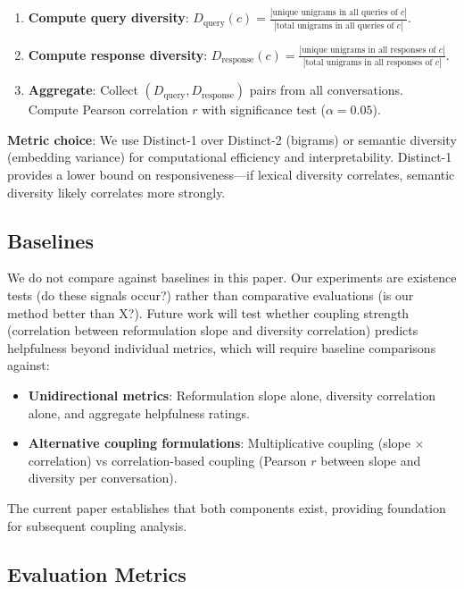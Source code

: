 \begin{enumerate}
\item \textbf{Compute query diversity}: $D_{\text{query}}(c) = \frac{|\text{unique unigrams in all queries of } c|}{|\text{total unigrams in all queries of } c|}$.

\item \textbf{Compute response diversity}: $D_{\text{response}}(c) = \frac{|\text{unique unigrams in all responses of } c|}{|\text{total unigrams in all responses of } c|}$.

\item \textbf{Aggregate}: Collect $(D_{\text{query}}, D_{\text{response}})$ pairs from all conversations. Compute Pearson correlation $r$ with significance test ($\alpha = 0.05$).
\end{enumerate}

\textbf{Metric choice}: We use Distinct-1 over Distinct-2 (bigrams) or semantic diversity (embedding variance) for computational efficiency and interpretability. Distinct-1 provides a lower bound on responsiveness---if lexical diversity correlates, semantic diversity likely correlates more strongly.

\subsection{Baselines}

We do not compare against baselines in this paper. Our experiments are existence tests (do these signals occur?) rather than comparative evaluations (is our method better than X?). Future work will test whether coupling strength (correlation between reformulation slope and diversity correlation) predicts helpfulness beyond individual metrics, which will require baseline comparisons against:

\begin{itemize}
\item \textbf{Unidirectional metrics}: Reformulation slope alone, diversity correlation alone, and aggregate helpfulness ratings.
\item \textbf{Alternative coupling formulations}: Multiplicative coupling (slope $\times$ correlation) vs correlation-based coupling (Pearson $r$ between slope and diversity per conversation).
\end{itemize}

The current paper establishes that both components exist, providing foundation for subsequent coupling analysis.

\subsection{Evaluation Metrics}

